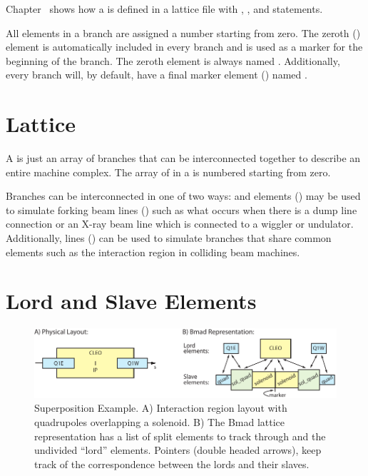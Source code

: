 Chapter~ shows how a  is defined in a
lattice file with , , and  statements.

All elements in a branch are assigned a number starting from zero. The
zeroth  () element is automatically
included in every branch and is used as a marker for the beginning of
the branch.  The zeroth element is always named .
Additionally, every branch will, by default, have a final marker
element () named .

\section{Lattice}
\label{s:lattice.def}

 A  is just an array of branches that
can be interconnected together to describe an entire machine complex.
The array of  in a  is numbered starting from
zero.

Branches can be interconnected in one of two ways:  and
 elements () may be used to simulate
forking beam lines () such as what occurs when there
is a dump line connection or an X-ray beam line which is connected to
a wiggler or undulator. Additionally,  lines
() can be used to simulate branches that share
common elements such as the interaction region in colliding beam
machines.

\section{Lord and Slave Elements}
\label{s:lattice}

\begin{figure}[tb]
 \begin{center}
 \includegraphics[width=6.0in]{superimpose-ip.pdf}
 \caption[Superposition example.]
 {
Superposition Example. A) Interaction region layout
with quadrupoles overlapping a solenoid. B) The Bmad lattice
representation has a list of split elements to track through and the
undivided ``lord'' elements. Pointers (double headed arrows), keep
track of the correspondence between the lords and their slaves.
 }
 \label{f:super.ip}
 \end{center}
 \end{figure}

